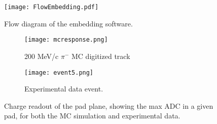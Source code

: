 





\begin{figure}[!htb]
\centering
\texttt{[image: FlowEmbedding.pdf]}
\caption{Flow diagram of the embedding software.}
\label{fig:flow}
\end{figure}


\begin{figure}[!htb]
    \centering
    \begin{subfigure}[t]{0.49\textwidth}
        \centering
        \texttt{[image: mcresponse.png]}
        \caption{200 MeV/c $\pi^-$ MC digitized track} \label{fig:mcevent}
    \end{subfigure}
    \hfill
    \begin{subfigure}[t]{.49\textwidth}
        \centering
        \texttt{[image: event5.png]} 
        \caption{Experimental data event.} \label{fig:dataevent}
    \end{subfigure}
    \caption{Charge readout of the pad plane, showing the max ADC in a given pad, for both the MC simulation and experimental data.}
\label{fig:mcDataEmbedtrack}
\end{figure}



